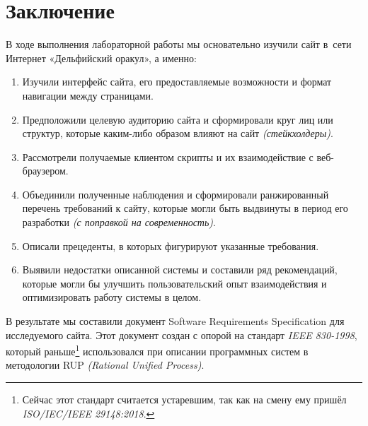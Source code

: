 \section{Заключение}

В ходе выполнения лабораторной работы мы основательно изучили сайт в~сети Интернет «Дельфийский оракул», а именно:
\begin{enumerate}
  \item Изучили интерфейс сайта, его предоставляемые возможности и формат навигации между страницами.
  \item Предположили целевую аудиторию сайта и сформировали круг лиц или структур, которые каким-либо образом влияют на сайт \textit{(стейкхолдеры)}.
  \item Рассмотрели получаемые клиентом скрипты и их взаимодействие с веб-браузером.
  \item Объединили полученные наблюдения и сформировали ранжированный перечень требований к сайту, которые могли быть выдвинуты в период его разработки \textit{(с поправкой на современность)}.
  \item Описали прецеденты, в которых фигурируют указанные требования.
  \item Выявили недостатки описанной системы и составили ряд рекомендаций, которые могли бы улучшить пользовательский опыт взаимодействия и оптимизировать работу системы в целом.
\end{enumerate}

В результате мы составили документ Software Requirements Specification для исследуемого сайта. Этот документ создан с опорой на стандарт \textit{IEEE 830-1998}\cite{ieee}, который раньше\footnote{Сейчас этот стандарт считается устаревшим, так как на смену ему пришёл \textit{ISO/IEC/IEEE 29148:2018}.} использовался при описании программных систем в методологии RUP \textit{(Rational Unified Process)}.